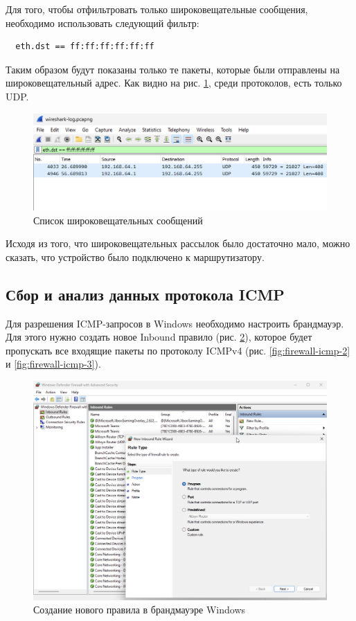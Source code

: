 \documentclass[a4paper, 14pt]{extarticle}
\begin{document}
Для того, чтобы отфильтровать только широковещательные сообщения, необходимо
использовать следующий фильтр:
\begin{verbatim}
  eth.dst == ff:ff:ff:ff:ff:ff
\end{verbatim}
Таким образом будут показаны только те пакеты, которые были отправлены на
широковещательный адрес. Как видно на рис. \ref{fig:broadcast}, среди
протоколов, есть только UDP.

\begin{figure}[H]
  \centering
  \includegraphics[width=\textwidth]{images/broadcast.png}
  \caption{Список широковещательных сообщений}
  \label{fig:broadcast}
\end{figure}

Исходя из того, что широковещательных рассылок было достаточно мало, можно
сказать, что устройство было подключено к маршрутизатору.

\subsection{Сбор и анализ данных протокола ICMP}

Для разрешения ICMP-запросов в Windows необходимо настроить брандмауэр. Для
этого нужно создать новое Inbound правило (рис. \ref{fig:firewall-icmp-1}),
которое будет пропускать все входящие пакеты по протоколу ICMPv4 (рис.
\ref{fig:firewall-icmp-2} и \ref{fig:firewall-icmp-3}).

\begin{figure}[H]
  \centering
  \includegraphics[width=\textwidth]{images/firewall-icmp-1.png}
  \caption{Создание нового правила в брандмауэре Windows}
  \label{fig:firewall-icmp-1}
\end{figure}
\end{document}
